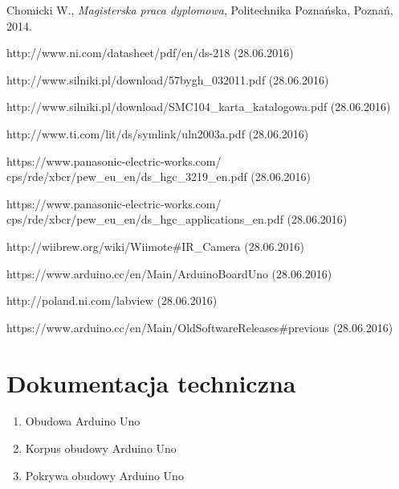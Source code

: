 \documentclass[12pt]{article} %
\numberwithin{equation}{subsection}
\numberwithin{figure}{section}
\numberwithin{table}{section}
\begin{document}
\begin{thebibliography}{99}
		Chomicki W., \emph{Magisterska praca dyplomowa}, Politechnika Poznańska, Poznań, 2014.
	
		http://www.ni.com/datasheet/pdf/en/ds-218 (28.06.2016)
		
		http://www.silniki.pl/download/57bygh\_032011.pdf (28.06.2016)
		
		http://www.silniki.pl/download/SMC104\_karta\_katalogowa.pdf (28.06.2016)
		
		http://www.ti.com/lit/ds/symlink/uln2003a.pdf (28.06.2016)
		
		https://www.panasonic-electric-works.com/ \\ cps/rde/xbcr/pew\_eu\_en/ds\_hgc\_3219\_en.pdf (28.06.2016)
		
		https://www.panasonic-electric-works.com/ \\ 
		cps/rde/xbcr/pew\_eu\_en/ds\_hgc\_applications\_en.pdf (28.06.2016)
		
		http://wiibrew.org/wiki/Wiimote\#IR\_Camera (28.06.2016)
		
		https://www.arduino.cc/en/Main/ArduinoBoardUno (28.06.2016)
		
		http://poland.ni.com/labview (28.06.2016)
		
		https://www.arduino.cc/en/Main/OldSoftwareReleases\#previous (28.06.2016)
		

\end{thebibliography}
	\newpage

	\listoffigures{}
	\newpage

	\listoftables
	\newpage

\section*{Dokumentacja techniczna}

	\begin{enumerate}
		\item{Obudowa Arduino Uno}
		\item{Korpus obudowy Arduino Uno}
		\item{Pokrywa obudowy Arduino Uno}
	\end{enumerate}


	\newpage
	\thispagestyle{empty}

	\newpage
	\thispagestyle{empty}
	

	\newpage
	\thispagestyle{empty}
	
	\thispagestyle{empty}
\end{document}

